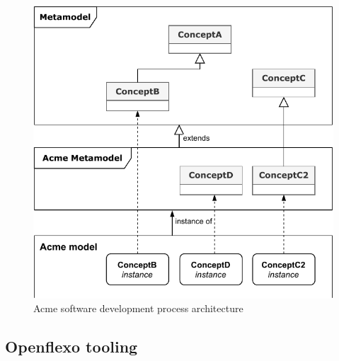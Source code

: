 \begin{figure}
 \centering
    \includegraphics[width=1.0 \columnwidth]{Figures/AcmeArchitecture.pdf}
     \caption{Acme software development process architecture}
    \label{fig:AcmeArchitecture}
\end{figure}

\subsection{Openflexo tooling}



